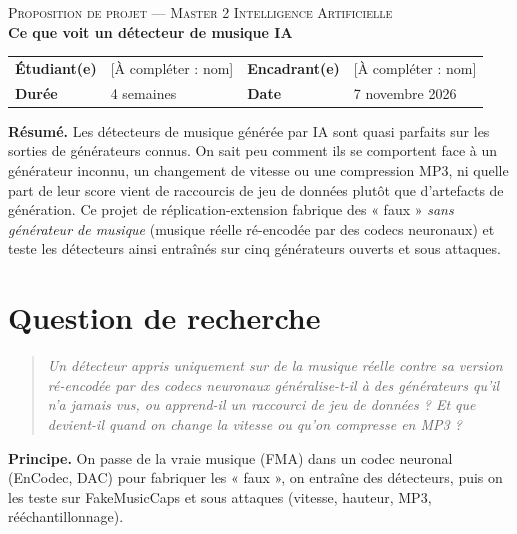 \documentclass[11pt,a4paper]{article}
\newcommand{\acompleter}[1]{\textcolor{red!70!black}{[À compléter : #1]}}
\begin{document}
\begin{center}
{\large\scshape Proposition de projet --- Master 2 Intelligence Artificielle}\\[0.7em]
{\LARGE\bfseries Ce que voit un détecteur de musique IA}
\end{center}

\vspace{0.2em}

\begin{tabularx}{\textwidth}{@{}>{\bfseries}l X >{\bfseries}l X@{}}
Étudiant(e) & \acompleter{nom} & Encadrant(e) & \acompleter{nom}\\
Durée & 4 semaines & Date & 7 novembre 2026\\
\end{tabularx}

\vspace{0.4em}

\textbf{Résumé.} Les détecteurs de musique générée par IA sont quasi parfaits sur les sorties de générateurs connus. On sait peu comment ils se comportent face à un générateur inconnu, un changement de vitesse ou une compression MP3, ni quelle part de leur score vient de raccourcis de jeu de données plutôt que d'artefacts de génération. Ce projet de réplication-extension fabrique des « faux » \emph{sans générateur de musique} (musique réelle ré-encodée par des codecs neuronaux) et teste les détecteurs ainsi entraînés sur cinq générateurs ouverts et sous attaques.

\section{Question de recherche}

\begin{quote}
\emph{Un détecteur appris uniquement sur de la musique réelle contre sa version ré-encodée par des codecs neuronaux généralise-t-il à des générateurs qu'il n'a jamais vus, ou apprend-il un raccourci de jeu de données ? Et que devient-il quand on change la vitesse ou qu'on compresse en MP3 ?}
\end{quote}

\textbf{Principe.} On passe de la vraie musique (FMA) dans un codec neuronal (EnCodec, DAC) pour fabriquer les « faux », on entraîne des détecteurs, puis on les teste sur FakeMusicCaps et sous attaques (vitesse, hauteur, MP3, rééchantillonnage).
\end{document}
